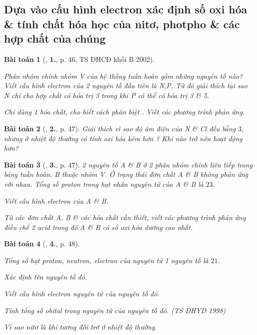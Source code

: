 \documentclass{article}
\numberwithin{equation}{section}
\newtheorem{baitoan}{Bài toán}
\begin{document}
\subsection{Dựa vào cấu hình electron xác định số oxi hóa \& tính chất hóa học của nitơ, photpho \& các hợp chất của chúng}

\begin{baitoan}[\cite{An_Hoa_Hoc_nang_cao_11_2020}, \textbf{1.}, p. 46, TS ĐHCĐ khối B 2002]
	\begin{enumerate*}
		\item[(a)] Phân nhóm chính nhóm V của hệ thống tuần hoàn gồm những nguyên tố nào? Viết cấu hình electron của 2 nguyên tố đầu tiên là \emph{N,P}. Từ đó giải thích tại sao \emph{N} chỉ cho hợp chất có hóa trị 3 trong khi \emph{P} có thể có hóa trị 3 \& 5.
		\item[(b)] Chỉ dùng 1 hóa chất, cho biết cách phân biệt \emph{}. Viết các phương trình phản ứng.
	\end{enumerate*}
\end{baitoan}

\begin{baitoan}[\cite{An_Hoa_Hoc_nang_cao_11_2020}, \textbf{2.}, p. 47]
	Giải thích vì sao độ âm điện của \emph{N} \& \emph{Cl} đều bằng $3$, nhưng ở nhiệt độ thường \emph{} có tính oxi hóa kém hơn \emph{}? Khi nào \emph{} trở nên hoạt động hơn?
\end{baitoan}

\begin{baitoan}[\cite{An_Hoa_Hoc_nang_cao_11_2020}, \textbf{3.}, p. 47]
	2 nguyên tố A \& B ở 2 phân nhóm chính liên tiếp trong bảng tuần hoàn. B thuộc nhóm V. Ở trạng thái đơn chất A \& B không phản ứng với nhau. Tổng số proton trong hạt nhân nguyên tử của A \& B là $23$.
	\begin{enumerate*}
		\item[(a)] Viết cấu hình electron của A \& B.
		\item[(b)] Từ các đơn chất A, B \& các hóa chất cần thiết, viết các phương trình phản ứng điều chế 2 acid trong đó A \& B có số oxi hóa dương cao nhất.
	\end{enumerate*}
\end{baitoan}

\begin{baitoan}[\cite{An_Hoa_Hoc_nang_cao_11_2020}, \textbf{4.}, p. 48]
	\begin{enumerate*}
		\item[(a)] Tổng số hạt proton, neutron, electron của nguyên tử 1 nguyên tố là $21$.
		\begin{enumerate*}
			\item[(1)] Xác định tên nguyên tố đó.
			\item[(2)] Viết cấu hình electron nguyên tử của nguyên tố đó.
			\item[(3)] Tính tổng số obital trong nguyên tử của nguyên tố đó. (TS ĐHYD 1998)
		\end{enumerate*}
		\item[(b)] Vì sao nitơ là khí tương đối trơ ở nhiệt độ thường.
	\end{enumerate*}
\end{baitoan}
\end{document}
